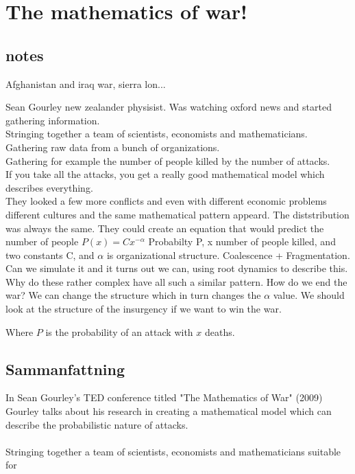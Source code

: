 \chapter{The mathematics of war!}
\section{notes}
Afghanistan and iraq war, sierra lon...

Sean Gourley new zealander physisist.
Was watching oxford news and started gathering information.\\ 
Stringing together a team of scientists, economists and mathematicians. \\
Gathering raw data from a bunch of organizations.\\
Gathering for example the number of people killed by the number of attacks.\\
If you take all the attacks, you get a really good mathematical model which describes everything. \\
They looked a few more conflicts and even with different economic problems different cultures and the same mathematical pattern appeard. The diststribution was always the same.
They could create an equation that would predict the number of people $P(x)=Cx^{-\alpha}$ Probabilty P, x number of people killed, and two constants C, and $\alpha$ is organizational structure. Coalescence + Fragmentation. Can we simulate it and it turns out we can, using root dynamics to describe this.
Why do these rather complex have all such a similar pattern.
How do we end the war?
We can change the structure which in turn changes the $\alpha$ value. We should look at the structure of the insurgency if we want to win the war.         

Where $P$ is the probability of an attack with $x$ deaths.
\section{Sammanfattning}
In Sean Gourley's TED conference titled "The Mathematics of War" (2009) Gourley talks about his research in creating a mathematical model which can describe the probabilistic nature of attacks.\\\\
Stringing together a team of scientists, economists and mathematicians suitable for  